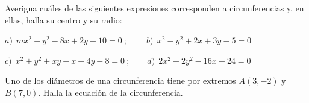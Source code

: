 \vspace{-6mm}
\begin{flushright}
\begin{footnotesize} \textcolor{gris}{}	\end{footnotesize}
\end{flushright}

\begin{mipropuesto}

Averigua cuáles de las siguientes expresiones corresponden a circunferencias y, en ellas, halla su centro y su radio:

\hspace{1cm} \vspace{2mm} $a)\ \ m x^2 + y^2 - 8x + 2y + 10 = 0\ ; \qquad   \ b) \ \ x^2-y^2 + 2x + 3y -5 = 0$


\hspace{1cm} \vspace{2mm} $c)\ \  x^2 + y^2 + xy -x + 4y - 8 = 0 \ ; \qquad d)\ \ 2x^2 + 2y^2 -16x + 24 = 0$
	
\end{mipropuesto}

\vspace{-6mm}
\begin{flushright}
\begin{footnotesize} \textcolor{gris}{}	\end{footnotesize}
\end{flushright}

\begin{mipropuesto}

Uno de los diámetros de una circunferencia tiene por extremos $A(3, -2)$ y $B(7, 0)$. Halla la ecuación de la circunferencia. 
	
\end{mipropuesto}

\vspace{-6mm}
\begin{flushright}
\begin{footnotesize} \textcolor{gris}{}	\end{footnotesize}
\end{flushright}

